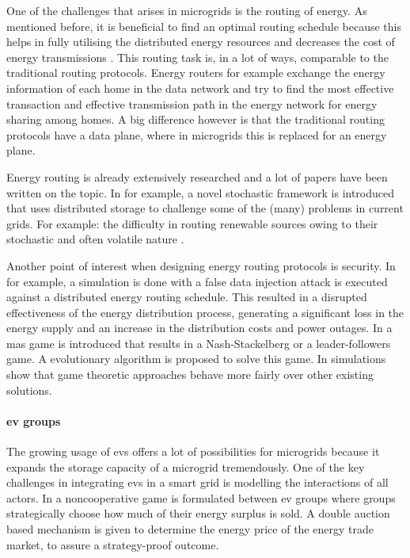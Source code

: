 One of the challenges that arises in microgrids is the routing of energy. As mentioned before, it is beneficial to find an optimal routing schedule because this helps in fully utilising the distributed energy resources and decreases the cost of energy transmissions \cite{HongKim2016}. This routing task is, in a lot of ways, comparable to the traditional routing protocols. Energy routers for example exchange the energy information of each home in the data network and try to find the most effective transaction and effective transmission path in the energy network for energy sharing among homes. \cite{YoonKimChang2013} A big difference however is that the traditional routing protocols have a data plane, where in microgrids this is replaced for an energy plane.

Energy routing is already extensively researched and a lot of papers have been written on the topic. In \cite{BaghaieMoellerKrishnamachari2010} for example, a novel stochastic framework is introduced that uses distributed storage to challenge some of the (many) problems in current grids. For example: the difficulty in routing renewable sources owing to their stochastic and often volatile nature \cite{HongKim2016}. 

Another point of interest when designing energy routing protocols is security. In \cite{LinYuYangEtAl2012} for example, a simulation is done with a false data injection attack is executed against a distributed energy routing schedule. This resulted in a disrupted effectiveness of the energy distribution process, generating a significant loss in the energy supply and an increase in the distribution costs and power outages. In \cite{AhouraiTabandehJahedEtAl2009} a \ac{mas} game is introduced that results in a Nash-Stackelberg or a leader-followers game. A evolutionary algorithm is proposed to solve this game. In \cite{AhouraiTabandehJahedEtAl2009} simulations show that game theoretic approaches behave more fairly over other existing solutions.
\paragraph{\ac{ev} groups}
The growing usage of \ac{ev}s offers a lot of possibilities for microgrids because it expands the storage capacity of a microgrid tremendously. One of the key challenges in integrating \ac{ev}s in a smart grid is modelling the interactions of all actors. In \cite{SaadHanPoorEtAl2011} a noncooperative game is formulated between \ac{ev} groups where groups strategically choose how much of their energy surplus is sold. A double auction based mechanism is given to determine the energy price of the energy trade market, to assure a strategy-proof outcome. 